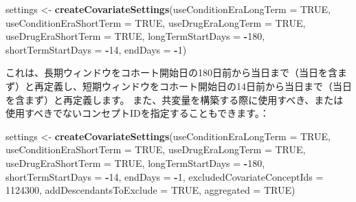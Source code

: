 \documentclass[
  11pt]{book}
\newenvironment{Shaded}{\begin{snugshade}}{\end{snugshade}}
\newcommand{\AttributeTok}[1]{\textcolor[rgb]{0.13,0.29,0.53}{#1}}
\newcommand{\ConstantTok}[1]{\textcolor[rgb]{0.56,0.35,0.01}{#1}}
\newcommand{\DecValTok}[1]{\textcolor[rgb]{0.00,0.00,0.81}{#1}}
\newcommand{\FunctionTok}[1]{\textcolor[rgb]{0.13,0.29,0.53}{\textbf{#1}}}
\newcommand{\NormalTok}[1]{#1}
\newcommand{\OtherTok}[1]{\textcolor[rgb]{0.56,0.35,0.01}{#1}}
\newcommand{\SpecialCharTok}[1]{\textcolor[rgb]{0.81,0.36,0.00}{\textbf{#1}}}
\theoremstyle{definition}
\theoremstyle{definition}
\theoremstyle{definition}
\theoremstyle{definition}
\theoremstyle{remark}
\begin{document}
\begin{Shaded}
\begin{Highlighting}[]
\NormalTok{settings }\OtherTok{\textless{}{-}} \FunctionTok{createCovariateSettings}\NormalTok{(}\AttributeTok{useConditionEraLongTerm =} \ConstantTok{TRUE}\NormalTok{,}
                                    \AttributeTok{useConditionEraShortTerm =} \ConstantTok{TRUE}\NormalTok{,}
                                    \AttributeTok{useDrugEraLongTerm =} \ConstantTok{TRUE}\NormalTok{,}
                                    \AttributeTok{useDrugEraShortTerm =} \ConstantTok{TRUE}\NormalTok{,}
                                    \AttributeTok{longTermStartDays =} \SpecialCharTok{{-}}\DecValTok{180}\NormalTok{,}
                                    \AttributeTok{shortTermStartDays =} \SpecialCharTok{{-}}\DecValTok{14}\NormalTok{,}
                                    \AttributeTok{endDays =} \SpecialCharTok{{-}}\DecValTok{1}\NormalTok{)}
\end{Highlighting}
\end{Shaded}

これは、長期ウィンドウをコホート開始日の180日前から当日まで（当日を含まず）と再定義し、短期ウィンドウをコホート開始日の14日前から当日まで（当日を含まず）と再定義します。 また、共変量を構築する際に使用すべき、または使用すべきでないコンセプトIDを指定することもできます。：

\begin{Shaded}
\begin{Highlighting}[]
\NormalTok{settings }\OtherTok{\textless{}{-}} \FunctionTok{createCovariateSettings}\NormalTok{(}\AttributeTok{useConditionEraLongTerm =} \ConstantTok{TRUE}\NormalTok{,}
                                    \AttributeTok{useConditionEraShortTerm =} \ConstantTok{TRUE}\NormalTok{,}
                                    \AttributeTok{useDrugEraLongTerm =} \ConstantTok{TRUE}\NormalTok{,}
                                    \AttributeTok{useDrugEraShortTerm =} \ConstantTok{TRUE}\NormalTok{,}
                                    \AttributeTok{longTermStartDays =} \SpecialCharTok{{-}}\DecValTok{180}\NormalTok{,}
                                    \AttributeTok{shortTermStartDays =} \SpecialCharTok{{-}}\DecValTok{14}\NormalTok{,}
                                    \AttributeTok{endDays =} \SpecialCharTok{{-}}\DecValTok{1}\NormalTok{,}
                                    \AttributeTok{excludedCovariateConceptIds =} \DecValTok{1124300}\NormalTok{,}
                                    \AttributeTok{addDescendantsToExclude =} \ConstantTok{TRUE}\NormalTok{,}
                                    \AttributeTok{aggregated =} \ConstantTok{TRUE}\NormalTok{)}
\end{Highlighting}
\end{Shaded}
\end{document}
